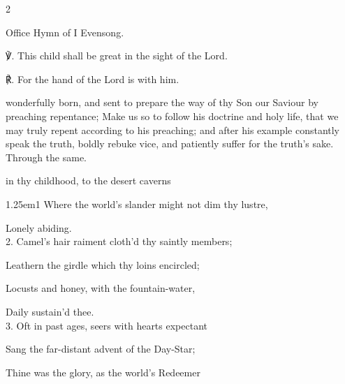 \begin{paracol}{2}
\secondEvensong
{}

\begin{rubric}
	Office Hymn of I Evensong.
\end{rubric}

℣. This child shall be great in the sight of the Lord.

℟. For the hand of the Lord is with him.


\collect
\label{JohnBaptistCollect}
 wonderfully born, and sent to prepare the way of thy Son our Saviour by preaching repentance; Make us so to follow his doctrine and holy life, that we may truly repent according to his preaching; and after his example constantly speak the truth, boldly rebuke vice, and patiently suffer for the truth's sake. Through the same.

\switchcolumn

\mattins
{}

\mattinsInvitatoryHymn
{} in thy childhood, to the desert caverns


\begin{hangparas}{1.25em}{1}
Where the world's slander might not dim thy lustre,

Lonely abiding.\\

2. Camel's hair raiment cloth'd thy saintly members;

Leathern the girdle which thy loins encircled;

Locusts and honey, with the fountain-water,

Daily sustain'd thee.\\

3. Oft in past ages, seers with hearts expectant

Sang the far-distant advent of the Day-Star;

Thine was the glory, as the world’s Redeemer


\end{hangparas}
\end{paracol}
